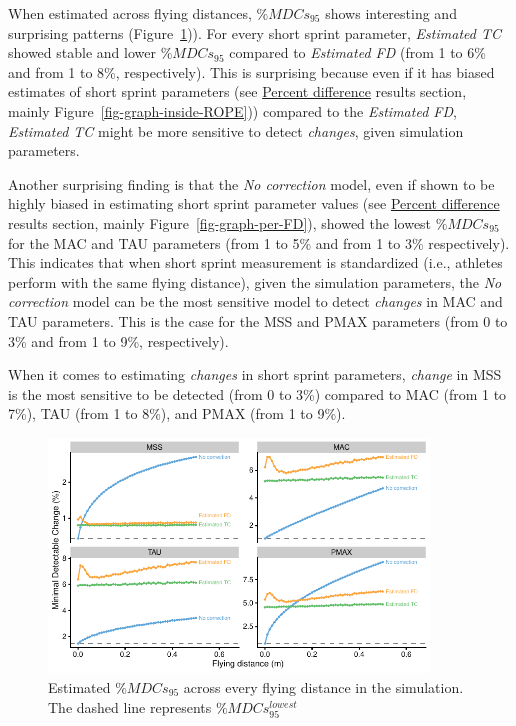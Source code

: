 \documentclass[
  letterpaper,
  DIV=11,
  numbers=noendperiod]{scrartcl}
\begin{document}
When estimated across flying distances, \(\%MDCs_{95}\) shows
interesting and surprising patterns (Figure~\ref{fig-graph-MDC})). For
every short sprint parameter, \emph{Estimated TC} showed stable and
lower \(\%MDCs_{95}\) compared to \emph{Estimated FD} (from 1 to 6\% and
from 1 to 8\%, respectively). This is surprising because even if it has
biased estimates of short sprint parameters (see
\protect\hyperlink{percent-difference}{Percent difference} results
section, mainly Figure~\ref{fig-graph-inside-ROPE})) compared to the
\emph{Estimated FD}, \emph{Estimated TC} might be more sensitive to
detect \emph{changes}, given simulation parameters.

Another surprising finding is that the \emph{No correction} model, even
if shown to be highly biased in estimating short sprint parameter values
(see \protect\hyperlink{percent-difference}{Percent difference} results
section, mainly Figure~\ref{fig-graph-per-FD}), showed the lowest
\(\%MDCs_{95}\) for the MAC and TAU parameters (from 1 to 5\% and from 1
to 3\% respectively). This indicates that when short sprint measurement
is standardized (i.e., athletes perform with the same flying distance),
given the simulation parameters, the \emph{No correction} model can be
the most sensitive model to detect \emph{changes} in MAC and TAU
parameters. This is the case for the MSS and PMAX parameters (from 0 to
3\% and from 1 to 9\%, respectively).

When it comes to estimating \emph{changes} in short sprint parameters,
\emph{change} in MSS is the most sensitive to be detected (from 0 to
3\%) compared to MAC (from 1 to 7\%), TAU (from 1 to 8\%), and PMAX
(from 1 to 9\%).

\begin{figure}

{\centering \includegraphics[width=0.9\textwidth,height=\textheight]{shorts-simulation-paper_files/figure-pdf/fig-graph-MDC-1.pdf}

}

\caption{\label{fig-graph-MDC}Estimated \(\%MDCs_{95}\) across every
flying distance in the simulation. The dashed line represents
\(\%MDCs_{95}^{lowest}\)}

\end{figure}
\end{document}
